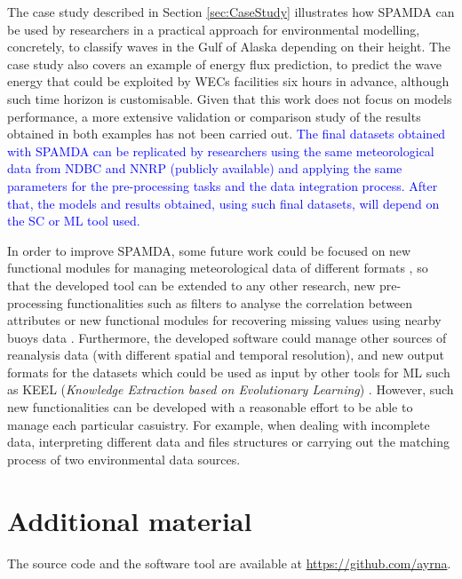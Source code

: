 \documentclass[energies,article,submit,moreauthors,pdftex]{Definitions/mdpi}
\begin{document}
		The case study described in Section \ref{sec:CaseStudy} illustrates how SPAMDA can be used by researchers in a practical approach for environmental modelling, concretely, to classify waves in the Gulf of Alaska depending on their height. The case study also covers an example of energy flux prediction, to predict the wave energy that could be exploited by WECs facilities six hours in advance, although such time horizon is customisable. Given that this work does not focus on models performance, a more extensive validation or comparison study of the results obtained in both examples has not been carried out. \textcolor{blue}{The final datasets obtained with SPAMDA can be replicated by researchers using the same meteorological data from NDBC and NNRP (publicly available) and applying the same parameters for the pre-processing tasks and the data integration process. After that, the models and results obtained, using such final datasets, will depend on the SC or ML tool used.}

		In order to improve SPAMDA, some future work could be focused on new functional modules for managing meteorological data of different formats \cite{NOAA_3}, so that the developed tool can be extended to any other research, new pre-processing functionalities such as filters to analyse the correlation between attributes or new functional modules for recovering missing values using nearby buoys data \cite{DuranRosal2016}. Furthermore, the developed software could manage other sources of reanalysis data (with different spatial and temporal resolution), and new output formats for the datasets which could be used as input by other tools for ML such as KEEL (\textit{Knowledge Extraction based on Evolutionary Learning}) \cite{AlcalFdez2009KEELAS}. However, such new functionalities can be developed with a reasonable effort to be able to manage each particular casuistry. For example, when dealing with incomplete data, interpreting different data and files structures or carrying out the matching process of two environmental data sources.

    \section*{Additional material}
	
		The source code and the software tool are available at \url{https://github.com/ayrna}.

\vspace{6pt} 
\end{document}
